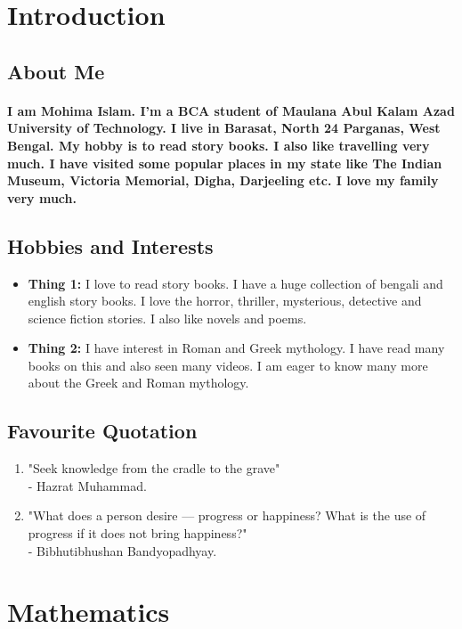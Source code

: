 \documentclass[12pt]{article}
\begin{document}
\section{Introduction}
\subsection{About Me}
\paragraph{I am Mohima Islam. I'm a BCA student of Maulana Abul Kalam Azad University of Technology. I live in Barasat, North 24 Parganas, West Bengal. My hobby is to read story books. I also like travelling very much. I have visited some popular places in my state like The Indian Museum, Victoria Memorial, Digha, Darjeeling etc. I love my family very much. }
\subsection{Hobbies and Interests}
\begin{itemize}
    \item \textbf{Thing 1: }I love to read story books. I have a huge collection of bengali and english story books. I love the horror, thriller, mysterious, detective and science fiction stories. I also like novels and poems.
    \item \textbf{Thing 2: }I have interest in Roman and Greek mythology. I have read many books on this and also seen many videos. I am eager to know many more about the Greek and Roman mythology. 
\end{itemize}
\subsection{Favourite Quotation}
\begin{enumerate} 
    \item "Seek knowledge from the cradle to the grave"\\
    - Hazrat Muhammad.
    \item "What does a person desire --- progress or happiness? What is the use of progress if it does not bring happiness?"\\
    - Bibhutibhushan Bandyopadhyay.
    \end{enumerate}
    \section{Mathematics}
\end{document}
